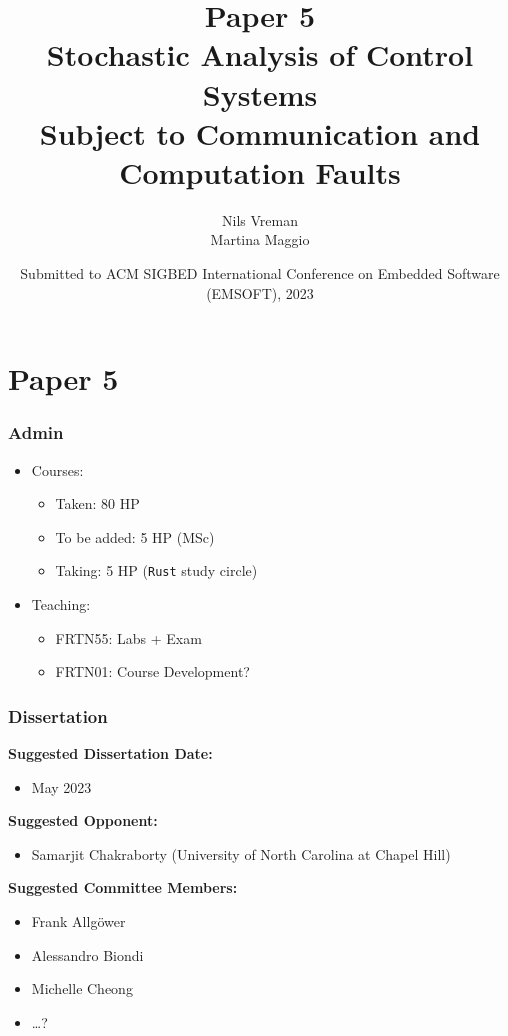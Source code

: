 \section{Paper 5}

\title[PhD Defence]{
    {\Huge Paper 5} \\
    \vspace{2mm}
    {\Large Stochastic Analysis of Control Systems}\\
    {\Large Subject to Communication and Computation Faults}
}
\author[Nils Vreman]{
    Nils Vreman \\
    \vspace{3mm}
    {\large Martina Maggio}
}
\date[EMSOFT 2023]{
    Submitted to ACM SIGBED International Conference on Embedded Software (EMSOFT), 2023\\
}
\notitlelogo
{}

\begin{frame}
    \frametitle{Admin}
    \begin{itemize}
        \item Courses: 
            \begin{itemize}
                \item Taken: 80 HP
                \item To be added: 5 HP (MSc)
                \item Taking: 5 HP (\texttt{Rust} study circle)
            \end{itemize} 
        \item Teaching: 
            \begin{itemize}
                \item FRTN55: Labs + Exam
                \item FRTN01: Course Development?
            \end{itemize}
    \end{itemize}
\end{frame}

\begin{frame}
    \frametitle{Dissertation}
    \textbf{Suggested Dissertation Date:}
    \begin{itemize}
        \item May 2023
    \end{itemize}

    \textbf{Suggested Opponent:}
    \begin{itemize}
        \item Samarjit Chakraborty (University of North Carolina at Chapel Hill)
    \end{itemize}

    \textbf{Suggested Committee Members:} 
    \begin{itemize}
        \item Frank Allg{\"o}wer
        \item Alessandro Biondi
        \item Michelle Cheong
        \item \dots ?
    \end{itemize}
\end{frame}

